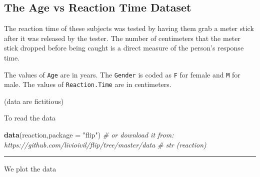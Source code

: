\documentclass[]{article}
\newenvironment{Shaded}{\begin{snugshade}}{\end{snugshade}}
\newcommand{\KeywordTok}[1]{\textcolor[rgb]{0.13,0.29,0.53}{\textbf{#1}}}
\newcommand{\DataTypeTok}[1]{\textcolor[rgb]{0.13,0.29,0.53}{#1}}
\newcommand{\DecValTok}[1]{\textcolor[rgb]{0.00,0.00,0.81}{#1}}
\newcommand{\StringTok}[1]{\textcolor[rgb]{0.31,0.60,0.02}{#1}}
\newcommand{\CommentTok}[1]{\textcolor[rgb]{0.56,0.35,0.01}{\textit{#1}}}
\newcommand{\OperatorTok}[1]{\textcolor[rgb]{0.81,0.36,0.00}{\textbf{#1}}}
\newcommand{\NormalTok}[1]{#1}
\begin{document}
\subsection{The Age vs Reaction Time
Dataset}\label{the-age-vs-reaction-time-dataset}

The reaction time of these subjects was tested by having them grab a
meter stick after it was released by the tester. The number of
centimeters that the meter stick dropped before being caught is a direct
measure of the person's response time.

The values of \texttt{Age} are in years. The \texttt{Gender} is coded as
\texttt{F} for female and \texttt{M} for male. The values of
\texttt{Reaction.Time} are in centimeters.

(data are fictitious)

To read the data

\begin{Shaded}
\begin{Highlighting}[]
\KeywordTok{data}\NormalTok{(reaction,}\DataTypeTok{package =} \StringTok{"flip"}\NormalTok{)}
\CommentTok{# or download it from: https://github.com/livioivil/flip/tree/master/data}
\CommentTok{# str (reaction)}
\end{Highlighting}
\end{Shaded}

\begin{center}\rule{0.5\linewidth}{\linethickness}\end{center}

We plot the data

\begin{Shaded}
\end{Shaded}
\end{document}
